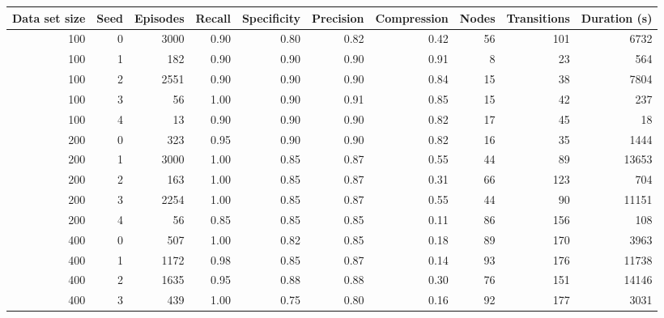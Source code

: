 \begin{tabular}{rrrrrrrrrr}
\toprule
 Data set size &  Seed &  Episodes &  Recall &  Specificity &  Precision &  Compression &  Nodes &  Transitions &  Duration (s) \\
\midrule
           100 &     0 &      3000 &    0.90 &         0.80 &       0.82 &         0.42 &     56 &          101 &          6732 \\
           100 &     1 &       182 &    0.90 &         0.90 &       0.90 &         0.91 &      8 &           23 &           564 \\
           100 &     2 &      2551 &    0.90 &         0.90 &       0.90 &         0.84 &     15 &           38 &          7804 \\
           100 &     3 &        56 &    1.00 &         0.90 &       0.91 &         0.85 &     15 &           42 &           237 \\
           100 &     4 &        13 &    0.90 &         0.90 &       0.90 &         0.82 &     17 &           45 &            18 \\
           200 &     0 &       323 &    0.95 &         0.90 &       0.90 &         0.82 &     16 &           35 &          1444 \\
           200 &     1 &      3000 &    1.00 &         0.85 &       0.87 &         0.55 &     44 &           89 &         13653 \\
           200 &     2 &       163 &    1.00 &         0.85 &       0.87 &         0.31 &     66 &          123 &           704 \\
           200 &     3 &      2254 &    1.00 &         0.85 &       0.87 &         0.55 &     44 &           90 &         11151 \\
           200 &     4 &        56 &    0.85 &         0.85 &       0.85 &         0.11 &     86 &          156 &           108 \\
           400 &     0 &       507 &    1.00 &         0.82 &       0.85 &         0.18 &     89 &          170 &          3963 \\
           400 &     1 &      1172 &    0.98 &         0.85 &       0.87 &         0.14 &     93 &          176 &         11738 \\
           400 &     2 &      1635 &    0.95 &         0.88 &       0.88 &         0.30 &     76 &          151 &         14146 \\
           400 &     3 &       439 &    1.00 &         0.75 &       0.80 &         0.16 &     92 &          177 &          3031 \\

\end{tabular}
